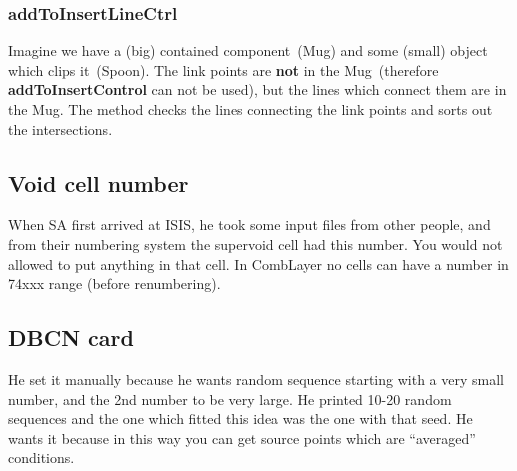 \subsubsection{addToInsertLineCtrl}
Imagine we have a (big) contained component~(Mug) and some (small) object which clips it~(Spoon). The link points are {\bf not} in the Mug~(therefore {\bf addToInsertControl} can not be used), but the lines which connect them are in the Mug.
The method checks the lines connecting the link points and sorts out the intersections.

\subsection{Void cell number}
When SA first arrived at ISIS, he took some input files from other people, and from their numbering system the supervoid cell had this number.
You would not allowed to put anything in that cell. In CombLayer no cells can have a number in 74xxx range (before renumbering).

\subsection{DBCN card}
He set it manually because he wants random sequence starting with a very small number, and the 2nd number to be very large.
He printed 10-20 random sequences and the one which fitted this idea was the one with that seed.
He wants it because in this way you can get source points which are ``averaged'' conditions.
